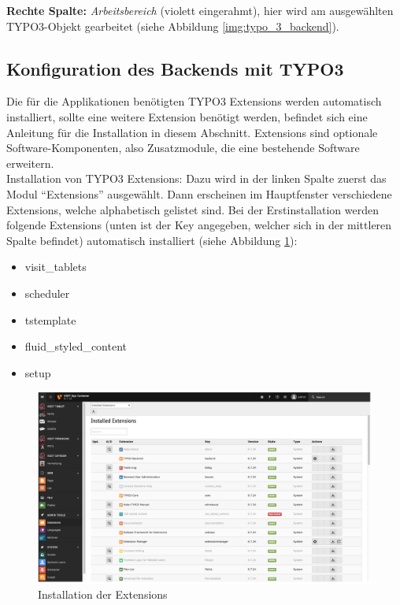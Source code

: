 \textbf{Rechte Spalte:} \textit{Arbeitsbereich} (violett eingerahmt), hier wird am ausgewählten TYPO3-Objekt gearbeitet (siehe Abbildung \ref{img:typo_3_backend}).

\subsection{Konfiguration des Backends mit TYPO3}

Die für die Applikationen benötigten TYPO3 Extensions werden automatisch installiert, sollte eine weitere Extension benötigt werden, befindet sich eine Anleitung für die Installation in diesem Abschnitt. Extensions sind optionale Software-Komponenten, also Zusatzmodule, die eine bestehende Software erweitern.\\
Installation von TYPO3 Extensions: Dazu wird in der linken Spalte zuerst das Modul “Extensions” ausgewählt. Dann erscheinen im Hauptfenster verschiedene Extensions, welche alphabetisch gelistet sind. Bei der Erstinstallation werden folgende Extensions (unten ist der Key angegeben, welcher sich in der mittleren Spalte befindet) automatisch installiert (siehe Abbildung \ref{img:extensions}):

\begin{itemize}
    \item visit\_tablets
    \item scheduler
    \item tstemplate
    \item fluid\_styled\_content
    \item setup
\end{itemize}

\begin{figure}[ht!]
\centering
\includegraphics[width=12cm]{Figures/paula/typo3/extensions.png}
\caption{Installation der Extensions}
\label{img:extensions}
\end{figure}

